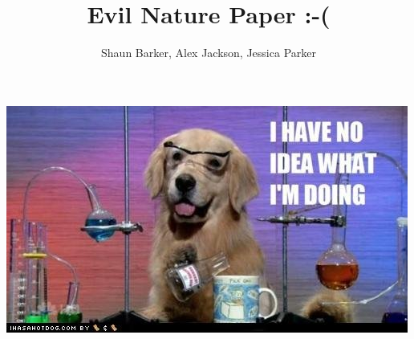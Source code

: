 \documentclass[12pt]{article}
\begin{document}
%
%

\title{Evil Nature Paper :-(}

\author{Shaun Barker, Alex Jackson, Jessica Parker}
\maketitle
%
%
%
%
%
%
\begin{center}
  \includegraphics[width=.6\linewidth]{i-have-no-idea-what-i-am-doing.jpeg}
  \end{center}
\end{document}
